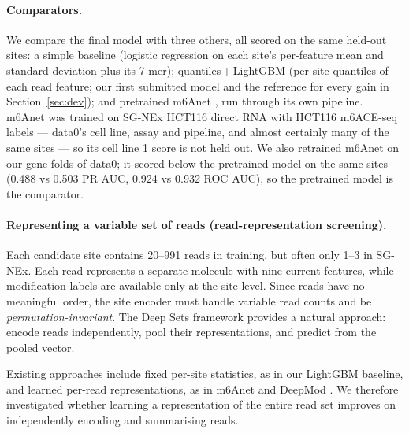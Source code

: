 \documentclass[11pt,a4paper]{article}
\begin{document}
\paragraph{Comparators.} We compare the final model with three others, all
scored on the same held-out sites: a simple baseline (logistic regression on
each site's per-feature mean and standard deviation plus its 7-mer);
quantiles\,+\,LightGBM \citep{ke2017} (per-site quantiles of each read
feature; our first submitted model and the reference for every gain in
Section~\ref{sec:dev}); and pretrained m6Anet \citep{hendra2022}, run through
its own pipeline. m6Anet was trained on SG-NEx HCT116 direct RNA with HCT116
m6ACE-seq labels \citep{koh2019} --- data0's cell line, assay and pipeline, and almost
certainly many of the same sites --- so its cell line 1 score is not held out.
We also retrained m6Anet on our gene folds of data0; it scored below the
pretrained model on the same sites (0.488 vs 0.503 PR AUC, 0.924 vs 0.932 ROC
AUC), so the pretrained model is the comparator.

\label{app:screen-protocol}
\paragraph{Representing a variable set of reads (read-representation screening).}
Each candidate site contains 20--991 reads in training, but often only 1--3 in SG-NEx. Each read represents a separate molecule with nine current features, while modification labels are available only at the site level. Since reads have no meaningful order, the site encoder must handle variable read counts and be \emph{permutation-invariant}. The Deep Sets framework \citep{zaheer2017} provides a natural approach: encode reads independently, pool their representations, and predict from the pooled vector.

Existing approaches include fixed per-site statistics, as in our LightGBM baseline, and learned per-read representations, as in m6Anet \citep{hendra2022} and DeepMod \citep{liu2019deepmod}. We therefore investigated whether learning a representation of the entire read set improves on independently encoding and summarising reads.
\end{document}
